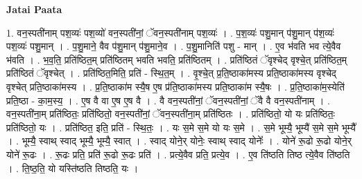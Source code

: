 \documentclass[17pt]{extarticle}
\begin{document}
\textbf{Jatai Paata} \newline

1. वन॒स्पती॑नाम् पश॒व्यः॑ पश॒व्यो॑ वन॒स्पती॑नां॒ ॅवन॒स्पती॑नाम् पश॒व्यः॑ । . प॒श॒व्यः॑ पशु॒मान् प॑शु॒मान् प॑श॒व्यः॑ पश॒व्यः॑ पशु॒मान् । . प॒शु॒माने॒ वैव प॑शु॒मान् प॑शु॒माने॒व । . प॒शु॒मानिति॑ पशु - मान् । . ए॒व भ॑वति भव त्ये॒वैव भ॑वति । . भ॒व॒ति॒ प्रति॑ष्ठित॒म् प्रति॑ष्ठितम् भवति भवति॒ प्रति॑ष्ठितम् । . प्रति॑ष्ठितं ॅवृश्चेद् वृश्चे॒त् प्रति॑ष्ठित॒म् प्रति॑ष्ठितं ॅवृश्चेत् । . प्रति॑ष्ठित॒मिति॒ प्रति॑ - स्थि॒त॒म् । . वृ॒श्चे॒त् प्र॒ति॒ष्ठाका॑मस्य प्रति॒ष्ठाका॑मस्य वृश्चेद् वृश्चेत् प्रति॒ष्ठाका॑मस्य । . प्र॒ति॒ष्ठाका॑म स्यै॒ष ए॒ष प्र॑ति॒ष्ठाका॑मस्य प्रति॒ष्ठाका॑म स्यै॒षः । . प्र॒ति॒ष्ठाका॑म॒स्येति॑ प्रति॒ष्ठा - का॒म॒स्य॒ । . ए॒ष वै वा ए॒ष ए॒ष वै । . वै वन॒स्पती॑नां॒ ॅवन॒स्पती॑नां॒ ॅवै वै वन॒स्पती॑नाम् । . वन॒स्पती॑ना॒म् प्रति॑ष्ठितः॒ प्रति॑ष्ठितो॒ वन॒स्पती॑नां॒ ॅवन॒स्पती॑ना॒म् प्रति॑ष्ठितः । . प्रति॑ष्ठितो॒ यो यः प्रति॑ष्ठितः॒ प्रति॑ष्ठितो॒ यः । . प्रति॑ष्ठित॒ इति॒ प्रति॑ - स्थि॒तः॒ । . यः स॒मे स॒मे यो यः स॒मे । . स॒मे भूम्यै॒ भूम्यै॑ स॒मे स॒मे भूम्यै᳚ । . भूम्यै॒ स्वाथ् स्वाद् भूम्यै॒ भूम्यै॒ स्वात् । . स्वाद् योने॒र् योनेः॒ स्वाथ् स्वाद् योनेः᳚ । . योने॑ रू॒ढो रू॒ढो योने॒र् योने॑ रू॒ढः । . रू॒ढः प्रति॒ प्रति॑ रू॒ढो रू॒ढः प्रति॑ । . प्रत्ये॒वैव प्रति॒ प्रत्ये॒व । . ए॒व ति॑ष्ठति तिष्ठ त्ये॒वैव ति॑ष्ठति । . ति॒ष्ठ॒ति॒ यो यस्ति॑ष्ठति तिष्ठति॒ यः । \newline
\end{document}
